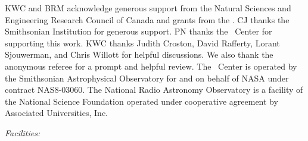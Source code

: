 \documentclass[12pt, preprint]{aastex}
\begin{document}
\acknowledgements

KWC and BRM acknowledge generous support from the Natural Sciences and
Engineering Research Council of Canada and grants from the \cxo. CJ
thanks the Smithsonian Institution for generous support. PN thanks the
\cxo\ Center for supporting this work. KWC thanks Judith Croston,
David Rafferty, Lorant Sjouwerman, and Chris Willott for helpful
discussions. We also thank the anonymous referee for a prompt and
helpful review. The \cxo\ Center is operated by the Smithsonian
Astrophysical Observatory for and on behalf of NASA under contract
NAS8-03060. The National Radio Astronomy Observatory is a facility of
the National Science Foundation operated under cooperative agreement
by Associated Universities, Inc.


{\it Facilities:}  





\clearpage

\clearpage


\end{document}
